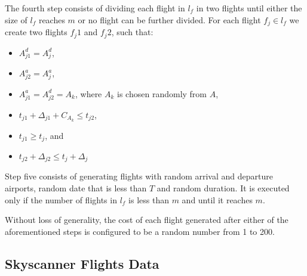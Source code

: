 \documentclass{mpaper}
\begin{document}
The fourth step consists of dividing each flight in $l_f$ in two flights until either the size of $l_f$ reaches $m$ or no flight can be further divided. For each flight $f_j \in l_f$ we create two flights $f_j1$ and $f_j2$, such that:

\begin{itemize}
\item $A^d_{j1} = A^d_j$,
\item $A^a_{j2} = A^a_j$,
\item $A^a_{j1} = A^d_{j2} = A_{k}$, where $A_{k}$ is chosen randomly from $A$,
\item $t_{j1} + \Delta_{j1} + C_{A_{k}} \leq t_{j2}$,
\item $t_{j1} \geq t_j$, and
\item $t_{j2} + \Delta_{j2} \leq t_j + \Delta_j$
\end{itemize}

Step five consists of generating flights with random arrival and departure airports, random date that is less than $T$ and random duration. It is executed only if the number of flights in $l_f$ is less than $m$ and until it reaches $m$.

Without loss of generality, the cost of each flight generated after either of the aforementioned steps is configured to be a random number from 1 to 200.

\subsection{Skyscanner Flights Data}





\end{document}
